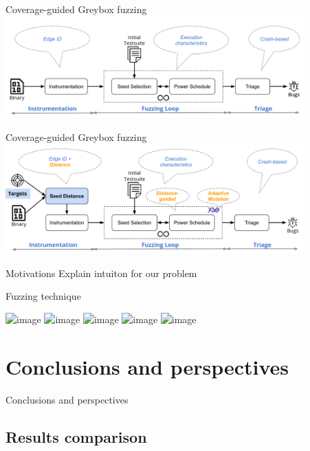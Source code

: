 \documentclass{beamer}
\begin{document}
\begin{frame}{Coverage-guided Greybox fuzzing}
\includegraphics[width=11.5cm]{Figures/Fuzzing/graph2.png}
\end{frame}

\begin{frame}{Coverage-guided Greybox fuzzing}
\includegraphics[width=11.5cm]{Figures/Fuzzing/graph3.png}
\end{frame}

\begin{frame}{Motivations}
Explain intuiton for our problem
\end{frame}

\begin{frame}{Fuzzing technique}

\includegraphics<1>[scale=0.3]{Figures/Fuzzing/1.png}
\includegraphics<2>[scale=0.3]{Figures/Fuzzing/2.png}
\includegraphics<3>[scale=0.3]{Figures/Fuzzing/3.png}
\includegraphics<4>[scale=0.3]{Figures/Fuzzing/4.png}
\includegraphics<5>[scale=0.3]{Figures/Fuzzing/5.png}

\end{frame}


\section{Conclusions and perspectives}

\begin{frame}
\centering
\LARGE Conclusions and perspectives
\end{frame}

\subsection{Results comparison}
\end{document}
